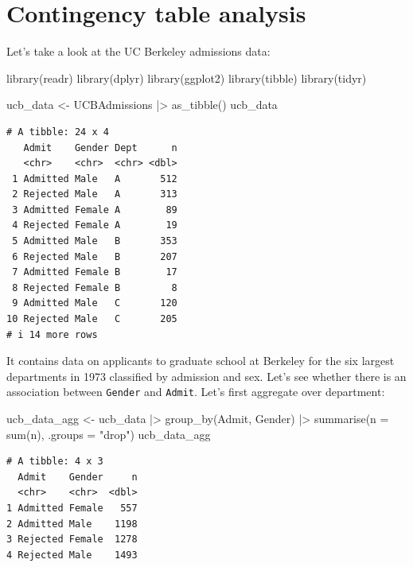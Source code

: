 \documentclass[
  11pt,
  letterpaper,
  oneside]{book}
\newenvironment{Shaded}{\begin{snugshade}}{\end{snugshade}}
\newcommand{\AttributeTok}[1]{\textcolor[rgb]{0.40,0.45,0.13}{#1}}
\newcommand{\FunctionTok}[1]{\textcolor[rgb]{0.28,0.35,0.67}{#1}}
\newcommand{\NormalTok}[1]{\textcolor[rgb]{0.00,0.23,0.31}{#1}}
\newcommand{\OtherTok}[1]{\textcolor[rgb]{0.00,0.23,0.31}{#1}}
\newcommand{\SpecialCharTok}[1]{\textcolor[rgb]{0.37,0.37,0.37}{#1}}
\newcommand{\StringTok}[1]{\textcolor[rgb]{0.13,0.47,0.30}{#1}}
\theoremstyle{plain}
\theoremstyle{plain}
\theoremstyle{definition}
\theoremstyle{definition}
\theoremstyle{plain}
\theoremstyle{remark}
\begin{document}
\hypertarget{sec-contingency-table}{%
\section{Contingency table analysis}\label{sec-contingency-table}}

Let's take a look at the UC Berkeley admissions data:

\begin{Shaded}
\begin{Highlighting}[]
\FunctionTok{library}\NormalTok{(readr)}
\FunctionTok{library}\NormalTok{(dplyr)}
\FunctionTok{library}\NormalTok{(ggplot2)}
\FunctionTok{library}\NormalTok{(tibble)}
\FunctionTok{library}\NormalTok{(tidyr)}

\NormalTok{ucb\_data }\OtherTok{\textless{}{-}}\NormalTok{ UCBAdmissions }\SpecialCharTok{|\textgreater{}} \FunctionTok{as\_tibble}\NormalTok{()}
\NormalTok{ucb\_data}
\end{Highlighting}
\end{Shaded}

\begin{verbatim}
# A tibble: 24 x 4
   Admit    Gender Dept      n
   <chr>    <chr>  <chr> <dbl>
 1 Admitted Male   A       512
 2 Rejected Male   A       313
 3 Admitted Female A        89
 4 Rejected Female A        19
 5 Admitted Male   B       353
 6 Rejected Male   B       207
 7 Admitted Female B        17
 8 Rejected Female B         8
 9 Admitted Male   C       120
10 Rejected Male   C       205
# i 14 more rows
\end{verbatim}

It contains data on applicants to graduate school at Berkeley for the
six largest departments in 1973 classified by admission and sex. Let's
see whether there is an association between \texttt{Gender} and
\texttt{Admit}. Let's first aggregate over department:

\begin{Shaded}
\begin{Highlighting}[]
\NormalTok{ucb\_data\_agg }\OtherTok{\textless{}{-}}\NormalTok{ ucb\_data }\SpecialCharTok{|\textgreater{}}
  \FunctionTok{group\_by}\NormalTok{(Admit, Gender) }\SpecialCharTok{|\textgreater{}}
  \FunctionTok{summarise}\NormalTok{(}\AttributeTok{n =} \FunctionTok{sum}\NormalTok{(n), }\AttributeTok{.groups =} \StringTok{"drop"}\NormalTok{)}
\NormalTok{ucb\_data\_agg}
\end{Highlighting}
\end{Shaded}

\begin{verbatim}
# A tibble: 4 x 3
  Admit    Gender     n
  <chr>    <chr>  <dbl>
1 Admitted Female   557
2 Admitted Male    1198
3 Rejected Female  1278
4 Rejected Male    1493
\end{verbatim}
\end{document}
